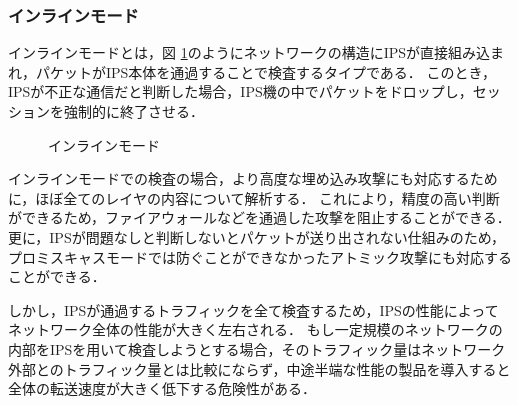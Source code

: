 \subsubsection{インラインモード}

インラインモードとは，図 \ref{fig:2-2}のようにネットワークの構造にIPSが直接組み込まれ，パケットがIPS本体を通過することで検査するタイプである\cite{ciscoips}．
このとき，IPSが不正な通信だと判断した場合，IPS機の中でパケットをドロップし，セッションを強制的に終了させる．

\begin{figure}[tb]
	\begin{center}
		\caption{インラインモード}
		\label{fig:2-2}
	\end{center}
\end{figure}

インラインモードでの検査の場合，より高度な埋め込み攻撃にも対応するために，ほぼ全てのレイヤの内容について解析する．
これにより，精度の高い判断ができるため，ファイアウォールなどを通過した攻撃を阻止することができる．
更に，IPSが問題なしと判断しないとパケットが送り出されない仕組みのため，プロミスキャスモードでは防ぐことができなかったアトミック攻撃にも対応することができる．

しかし，IPSが通過するトラフィックを全て検査するため，IPSの性能によってネットワーク全体の性能が大きく左右される．
もし一定規模のネットワークの内部をIPSを用いて検査しようとする場合，そのトラフィック量はネットワーク外部とのトラフィック量とは比較にならず，中途半端な性能の製品を導入すると全体の転送速度が大きく低下する危険性がある．